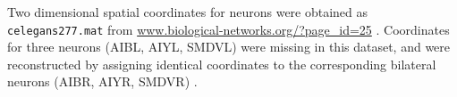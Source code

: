 \documentclass[10pt,letterpaper]{article}
\begin{document}
Two dimensional spatial coordinates for neurons were obtained as \texttt{celegans277.mat} from \url{www.biological-networks.org/?page_id=25} \cite{choe2004network}.
Coordinates for three neurons (AIBL, AIYL, SMDVL) were missing in this dataset, and were reconstructed by assigning identical coordinates to the corresponding bilateral neurons (AIBR, AIYR, SMDVR) \cite{Varier2011}.
\end{document}
